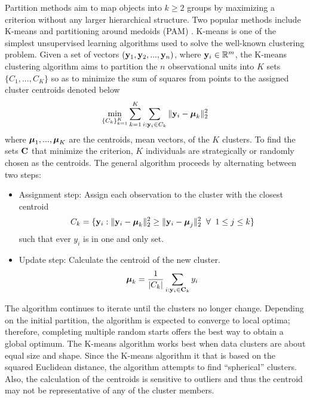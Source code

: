 Partition methods aim to map objects into $k\geq 2$ groups by maximizing a criterion without any larger hierarchical structure. Two popular methods include K-means \cite{macqueen1967} and partitioning around medoids (PAM) \cite{kaufman1990}. K-means is one of the simplest unsupervised learning algorithms used to solve the well-known clustering problem. Given a set of vectors $(\mathbf y_{1},\mathbf y_{2},...,\mathbf y_{n})$, where $\mathbf y_{i}\in\mathbb{R}^{m}$, the K-means clustering algorithm aims to partition the $n$ observational units into $K$ sets $\{C_{1},...,C_{K}\}$ so as to minimize the sum of squares from points to the assigned cluster centroids denoted below
$$\min_{\{C_{k}\}_{k=1}^{K}}\sum_{k=1}^{K}\sum_{i: \mathbf y_{i}\in C_{k}}\|\mathbf y_{i} -\boldsymbol \mu_{k}\|_{2}^{2}$$
where $\boldsymbol\mu_{1},...,\boldsymbol\mu_{K}$ are the centroids, mean vectors, of the $K$ clusters. To find the sets $\mathbf C$ that minimize the criterion, $K$ individuals are strategically or randomly chosen as the centroids. The general algorithm proceeds by alternating between two steps:
\begin{itemize}
\item Assignment step: Assign each observation to the cluster with the closest centroid
$$ C_{k} = \{\mathbf y_{i}: \|\mathbf y_{i} - \boldsymbol\mu_{k}\|_{2}^{2}\geq \|\mathbf y_{i} - \boldsymbol\mu_{j}\|_{2}^{2} \;\;\forall\;\; 1\leq j\leq k\}$$
such that ever $y_{i}$ is in one and only set.
\item Update step: Calculate the centroid of the new cluster.
$$\boldsymbol\mu_{k} = \frac{1}{|C_{k}|}\sum_{i: \mathbf y_{i}\in\mathbf C_{k}} y_{i}$$
\end{itemize}
The algorithm continues to iterate until the clusters no longer change. Depending on the initial partition, the algorithm is expected to converge to local optima; therefore, completing multiple random starts offers the best way to obtain a global optimum. The K-means algorithm works best when data clusters are about equal size and shape. Since the K-means algorithm it that is based on the squared Euclidean distance, the algorithm attempts to find ``spherical'' clusters. Also, the calculation of the centroids is sensitive to outliers and thus the centroid may not be representative of any of the cluster members.

